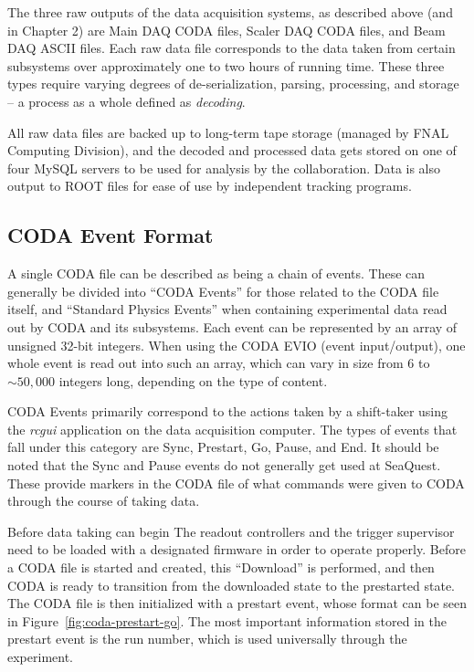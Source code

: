 The three raw outputs of the data acquisition systems, as described above (and in Chapter 2) are Main DAQ CODA files, Scaler DAQ CODA files, and Beam DAQ ASCII files. Each raw data file corresponds to the data taken from certain subsystems over approximately one to two hours of running time. These three types require varying degrees of de-serialization, parsing, processing, and storage -- a process as a whole defined as \emph{decoding}. 

All raw data files are backed up to long-term tape storage (managed by FNAL Computing Division), and the decoded and processed data gets stored on one of four MySQL servers to be used for analysis by the collaboration. Data is also output to ROOT files for ease of use by independent tracking programs.

\subsection{CODA Event Format}

A single CODA file can be described as being a chain of events. These can generally be divided into ``CODA Events'' for those related to the CODA file itself, and ``Standard Physics Events'' when containing experimental data read out by CODA and its subsystems. Each event can be represented by an array of unsigned 32-bit integers. When using the CODA EVIO (event input/output), one whole event is read out into such an array, which can vary in size from 6 to $\sim50,000$ integers long, depending on the type of content.

CODA Events primarily correspond to the actions taken by a shift-taker using the \emph{rcgui} application on the data acquisition computer. The types of events that fall under this category are Sync, Prestart, Go, Pause, and End. It should be noted that the Sync and Pause events do not generally get used at SeaQuest. These provide markers in the CODA file of what commands were given to CODA through the course of taking data. 

Before data taking can begin The readout controllers and the trigger supervisor need to be loaded with a designated firmware in order to operate properly. Before a CODA file is started and created, this ``Download'' is performed, and then CODA is ready to transition from the downloaded state to the prestarted state. The CODA file is then initialized with a prestart event, whose format can be seen in Figure~\ref{fig:coda-prestart-go}. The most important information stored in the prestart event is the run number, which is used universally through the experiment. 

